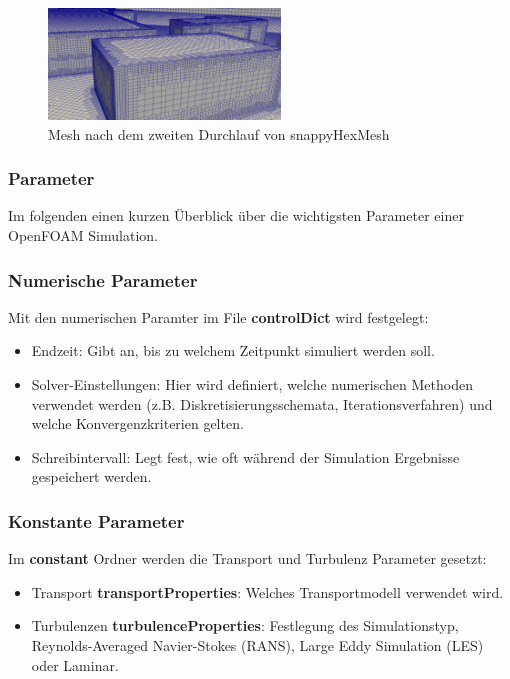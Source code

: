 \begin{figure}
    \centering
    \includegraphics[width=0.55\textwidth]{papers/openfoam/Bilder/Snappy_fein.png}
    \caption{Mesh nach dem zweiten Durchlauf von snappyHexMesh}
    \label{fig:snappyfeinbild}
\end{figure}
\subsubsection{Parameter\label{openfoam:section:Parameter}}
Im folgenden einen kurzen Überblick über die wichtigsten Parameter einer OpenFOAM Simulation.

\subsubsection{Numerische Parameter\label{openfoam:section:Numerische Parameter}}
Mit den numerischen Paramter im File \textbf{controlDict} wird festgelegt:
\begin{itemize}
    \item Endzeit: Gibt an, bis zu welchem Zeitpunkt simuliert werden soll.
    \item Solver-Einstellungen: Hier wird definiert, welche numerischen Methoden verwendet werden (z.B. Diskretisierungsschemata, Iterationsverfahren) und welche Konvergenzkriterien gelten.
    \item Schreibintervall: Legt fest, wie oft während der Simulation Ergebnisse gespeichert werden.
\end{itemize}

\subsubsection{Konstante Parameter\label{openfoam:section:Konstante Parameter}}
Im \textbf{constant} Ordner werden die Transport und Turbulenz Parameter gesetzt:
\begin{itemize}
    \item Transport \textbf{transportProperties}: Welches Transportmodell verwendet wird.
    \item Turbulenzen \textbf{turbulenceProperties}: Festlegung des Simulationstyp, Reynolds-Averaged Navier-Stokes (RANS), Large Eddy Simulation (LES) oder Laminar.
\end{itemize}

